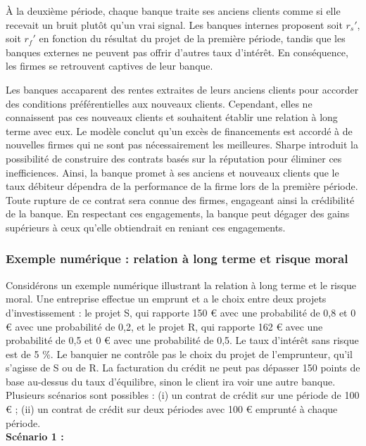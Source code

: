 \documentclass[a4paper, 12pt]{report}
\begin{document}
À la deuxième période, chaque banque traite ses anciens clients comme si elle recevait un bruit plutôt qu'un vrai signal. Les banques internes proposent soit \( r_s' \), soit \( r_f' \) en fonction du résultat du projet de la première période, tandis que les banques externes ne peuvent pas offrir d'autres taux d'intérêt. En conséquence, les firmes se retrouvent captives de leur banque.

Les banques accaparent des rentes extraites de leurs anciens clients pour accorder des conditions préférentielles aux nouveaux clients. Cependant, elles ne connaissent pas ces nouveaux clients et souhaitent établir une relation à long terme avec eux. Le modèle conclut qu'un excès de financements est accordé à de nouvelles firmes qui ne sont pas nécessairement les meilleures. Sharpe introduit la possibilité de construire des contrats basés sur la réputation pour éliminer ces inefficiences. Ainsi, la banque promet à ses anciens et nouveaux clients que le taux débiteur dépendra de la performance de la firme lors de la première période. Toute rupture de ce contrat sera connue des firmes, engageant ainsi la crédibilité de la banque. En respectant ces engagements, la banque peut dégager des gains supérieurs à ceux qu'elle obtiendrait en reniant ces engagements.

\subsubsection{Exemple numérique : relation à long terme et risque moral}

Considérons un exemple numérique illustrant la relation à long terme et le risque moral. Une entreprise effectue un emprunt et a le choix entre deux projets d'investissement : le projet S, qui rapporte 150 € avec une probabilité de 0,8 et 0 € avec une probabilité de 0,2, et le projet R, qui rapporte 162 € avec une probabilité de 0,5 et 0 € avec une probabilité de 0,5. Le taux d'intérêt sans risque est de 5 \%. Le banquier ne contrôle pas le choix du projet de l'emprunteur, qu'il s'agisse de S ou de R. La facturation du crédit ne peut pas dépasser 150 points de base au-dessus du taux d'équilibre, sinon le client ira voir une autre banque. Plusieurs scénarios sont possibles : (i) un contrat de crédit sur une période de 100 € ; (ii) un contrat de crédit sur deux périodes avec 100 € emprunté à chaque période.\\

\textbf{Scénario 1 :} 
\\\noindent
\end{document}
